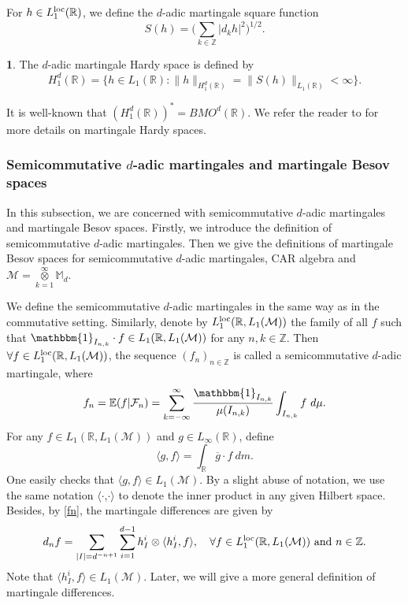 \documentclass[oneside,english,a4wide]{amsart}
\numberwithin{equation}{section}
\numberwithin{figure}{section}
\theoremstyle{plain}
\theoremstyle{plain}
\theoremstyle{definition}
\newtheorem{defn}[thm]{\protect\definitionname}
\theoremstyle{plain}
\theoremstyle{remark}
\theoremstyle{definition}
\theoremstyle{remark}
\theoremstyle{definition}
\providecommand{\definitionname}{Definition}
\newcommand{\M}{{\mathcal M}}
\newcommand{\8}{\infty}
\newcommand{\la}{\langle}
\newcommand{\ra}{\rangle}
\begin{document}
For $h\in L_1^{\rm{loc}}(\mathbb{R})$, we define the $d$-adic martingale square function
\begin{equation*}
	S(h)=\biggl(\sum_{k\in\mathbb{Z}} |d_kh|^2\biggr)^{1/2}.
\end{equation*}

\begin{defn}
	The $d$-adic martingale Hardy space is defined by
	\begin{equation}\label{defnh1d}
		H^d_1(\mathbb{R})=\{h\in L_1(\mathbb{R}):\|h\|_{H^d_1(\mathbb{R})}=\|S(h)\|_{L_1(\mathbb{R})}<\infty\}.
	\end{equation}
\end{defn}
It is well-known that $(H_1^d(\mathbb{R}))^*=BMO^d(\mathbb{R})$. We refer the reader to \cite{GA} for more details on martingale Hardy spaces.




\subsubsection{\textbf{Semicommutative $d$-adic martingales and martingale Besov spaces}}\label{sec2.3}

In this subsection, we are concerned with semicommutative $d$-adic martingales and martingale Besov spaces. Firstly, we introduce the definition of semicommutative $d$-adic martingales. Then we give the definitions of martingale Besov spaces for semicommutative $d$-adic martingales, CAR algebra and $\mathscr{M}=\mathop{\otimes}\limits_{k=1}^{\infty}\mathbb{M}_{d}$.

We define the semicommutative $d$-adic martingales in the same way as in the commutative setting. Similarly, denote by $L^{\rm{loc}}_1({\mathbb{R}}, L_1(\M))$ the family of all $f$ such that $\mathbbm{1}_{I_{n, k}}\cdot f \in L_1({\mathbb{R}}, L_1(\M))$ for any $n, k\in\mathbb{Z}$. Then $\forall f\in L_1^{\rm{loc}}(\mathbb{R}, L_1(\M))$, the sequence $(f_n)_{n\in\mathbb{Z}}$ is called a semicommutative $d$-adic martingale, where
\begin{equation}\label{fn}
	f_n= \mathbb{E}(f|\mathcal{F}_n)=\sum_{k=-\8}^{\8}\frac{\mathbbm{1}_{I_{n,k}}}{\mu(I_{n,k})}\int_{I_{n,k}}f\ d\mu.  
\end{equation}
For any $f\in L_1(\mathbb{R},L_1(\mathcal{M}))$ and $g\in L_\8(\mathbb{R})$, define
\[\langle g, f\rangle= \int_{\mathbb{R}}\overline{g} \cdot f \ dm. \]
One easily checks that $\la g, f\ra \in L_1(\M)$. By a slight abuse of notation, we use the same notation $\langle$$\cdot$,$\cdot$$\rangle$ to denote the inner product in any given Hilbert space. Besides, by \eqref{fn}, the martingale differences are given by 
$$ d_n f=\sum_{|I|=d^{-n+1}}\sum_{i=1}^{d-1}h_I^i\otimes\langle h_I^i,f\rangle, \quad \forall f\in L_1^{\rm{loc}}(\mathbb{R}, L_1(\M)) \ \text{and} \ n\in \mathbb{Z}. $$
Note that $\langle h_I^i,f\rangle\in L_1(\M)$. Later, we will give a more general definition of martingale differences.
\end{document}
